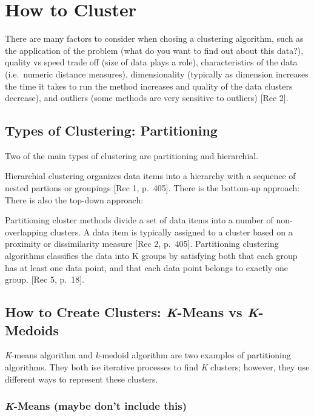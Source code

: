 \documentclass[12pt,twoside]{amherstthesis}
\begin{document}
  \chapter{How to Cluster}\label{rmd-basics}
  
  There are many factors to consider when chosing a clustering algorithm,
  such as the application of the problem (what do you want to find out
  about this data?), quality vs speed trade off (size of data plays a
  role), characteristics of the data (i.e.~numeric distance measures),
  dimensionality (typically as dimension increases the time it takes to
  run the method increases and quality of the data clusters decrease), and
  outliers (some methods are very sensitive to outliers) {[}Rec 2{]}.
  
  \section{Types of Clustering:
  Partitioning}\label{types-of-clustering-partitioning}
  
  Two of the main types of clustering are partitioning and hierarchial.
  
  Hierarchial clustering organizes data items into a hierarchy with a
  sequence of nested partions or groupings {[}Rec 1, p.~405{]}. There is
  the bottom-up approach: There is also the top-down approach:
  
  Partitioning cluster methods divide a set of data items into a number of
  non-overlapping clusters. A data item is typically assigned to a cluster
  based on a proximity or dissimilarity measure {[}Rec 2, p.~405{]}.
  Partitioning clustering algorithms classifies the data into K groups by
  satisfying both that each group has at least one data point, and that
  each data point belongs to exactly one group. {[}Rec 5, p.~18{]}.
  
  \section{\texorpdfstring{How to Create Clusters: \emph{K}-Means vs
  \emph{K}-Medoids}{How to Create Clusters: K-Means vs K-Medoids}}\label{how-to-create-clusters-k-means-vs-k-medoids}
  
  \emph{K}-means algorithm and \emph{k}-medoid algorithm are two examples
  of partitioning algorithms. They both ise iterative processes to find
  \emph{K} clusters; however, they use different ways to represent these
  clusters.
  
  \subsection{\texorpdfstring{\emph{K}-Means (maybe don't include
  this)}{K-Means (maybe don't include this)}}\label{k-means-maybe-dont-include-this}
  
\end{document}
